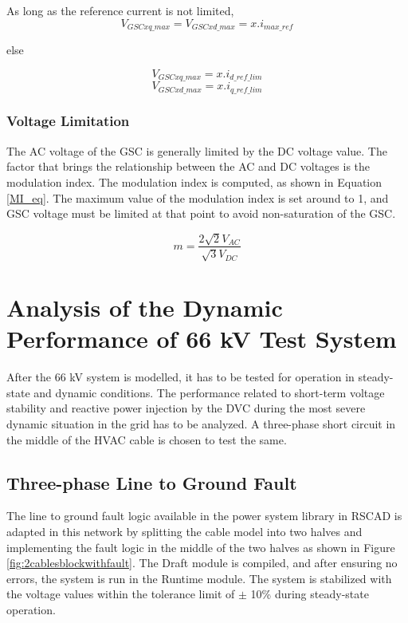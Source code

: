 As long as the reference current is not limited,
\begin{equation}\label{vol_lim_1}
    V_{GSCxq\_max} = V_{GSCxd\_max} = x . i_{max\_ref}
\end{equation}

else

\begin{equation}\label{vol_lim_2}
    V_{GSCxq\_max} = x . i_{d\_ref\_lim} 
\end{equation}
\begin{equation}\label{vol_lim_3}
    V_{GSCxd\_max} = x . i_{q\_ref\_lim}
\end{equation}

\subsubsection{Voltage Limitation}
The \gls{AC} voltage of the \gls{GSC} is generally limited by the \gls{DC} voltage value. The factor that brings the relationship between the \gls{AC} and \gls{DC} voltages is the modulation index. The modulation index is computed, as shown in Equation \ref{MI_eq}. The maximum value of the modulation index is set around to 1, and \gls{GSC} voltage must be limited at that point to avoid non-saturation of the \gls{GSC}. 

\begin{equation}\label{MI_eq}
    m = \frac{2\sqrt{2} V_{AC}}{\sqrt{3} {V_{DC}}}
\end{equation}

\section{Analysis of the Dynamic Performance of 66 kV Test System}
After the 66 kV system is modelled, it has to be tested for operation in steady-state and dynamic conditions. The performance related to short-term voltage stability and reactive power injection by the \gls{DVC} during the most severe dynamic situation in the grid has to be analyzed. A three-phase short circuit in the middle of the \gls{HVAC} cable is chosen to test the same.

\subsection{Three-phase Line to Ground Fault}

The line to ground fault logic available in the power system library in RSCAD is adapted in this network by splitting the cable model into two halves and implementing the fault logic in the middle of the two halves as shown in Figure \ref{fig:2cablesblockwithfault}. %
The Draft module is compiled, and after ensuring no errors, the system is run in the Runtime module. The system is stabilized with the voltage values within the tolerance limit of $\pm$ 10\% during steady-state operation.

